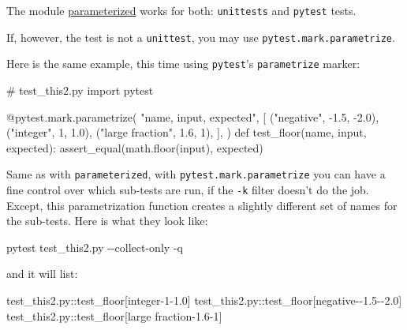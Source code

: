 \documentclass[
]{report}
\newenvironment{Shaded}{\begin{snugshade}}{\end{snugshade}}
\newcommand{\AttributeTok}[1]{\textcolor[rgb]{0.40,0.45,0.13}{#1}}
\newcommand{\BuiltInTok}[1]{\textcolor[rgb]{0.00,0.23,0.31}{#1}}
\newcommand{\CommentTok}[1]{\textcolor[rgb]{0.37,0.37,0.37}{#1}}
\newcommand{\DecValTok}[1]{\textcolor[rgb]{0.68,0.00,0.00}{#1}}
\newcommand{\ExtensionTok}[1]{\textcolor[rgb]{0.00,0.23,0.31}{#1}}
\newcommand{\FloatTok}[1]{\textcolor[rgb]{0.68,0.00,0.00}{#1}}
\newcommand{\ImportTok}[1]{\textcolor[rgb]{0.00,0.46,0.62}{#1}}
\newcommand{\KeywordTok}[1]{\textcolor[rgb]{0.00,0.23,0.31}{#1}}
\newcommand{\NormalTok}[1]{\textcolor[rgb]{0.00,0.23,0.31}{#1}}
\newcommand{\OperatorTok}[1]{\textcolor[rgb]{0.37,0.37,0.37}{#1}}
\newcommand{\StringTok}[1]{\textcolor[rgb]{0.13,0.47,0.30}{#1}}
\begin{document}
The module \href{https://pypi.org/project/parameterized/}{parameterized}
works for both: \texttt{unittests} and \texttt{pytest} tests.

If, however, the test is not a \texttt{unittest}, you may use
\texttt{pytest.mark.parametrize}.

Here is the same example, this time using \texttt{pytest}'s
\texttt{parametrize} marker:

\begin{Shaded}
\begin{Highlighting}[]
\CommentTok{\# test\_this2.py}
\ImportTok{import}\NormalTok{ pytest}


\AttributeTok{@pytest.mark.parametrize}\NormalTok{(}
    \StringTok{"name, input, expected"}\NormalTok{,}
\NormalTok{    [}
\NormalTok{        (}\StringTok{"negative"}\NormalTok{, }\OperatorTok{{-}}\FloatTok{1.5}\NormalTok{, }\OperatorTok{{-}}\FloatTok{2.0}\NormalTok{),}
\NormalTok{        (}\StringTok{"integer"}\NormalTok{, }\DecValTok{1}\NormalTok{, }\FloatTok{1.0}\NormalTok{),}
\NormalTok{        (}\StringTok{"large fraction"}\NormalTok{, }\FloatTok{1.6}\NormalTok{, }\DecValTok{1}\NormalTok{),}
\NormalTok{    ],}
\NormalTok{)}
\KeywordTok{def}\NormalTok{ test\_floor(name, }\BuiltInTok{input}\NormalTok{, expected):}
\NormalTok{    assert\_equal(math.floor(}\BuiltInTok{input}\NormalTok{), expected)}
\end{Highlighting}
\end{Shaded}

Same as with \texttt{parameterized}, with
\texttt{pytest.mark.parametrize} you can have a fine control over which
sub-tests are run, if the \texttt{-k} filter doesn't do the job. Except,
this parametrization function creates a slightly different set of names
for the sub-tests. Here is what they look like:

\begin{Shaded}
\begin{Highlighting}[]
\ExtensionTok{pytest}\NormalTok{ test\_this2.py }\AttributeTok{{-}{-}collect{-}only} \AttributeTok{{-}q}
\end{Highlighting}
\end{Shaded}

and it will list:

\begin{Shaded}
\begin{Highlighting}[]
\ExtensionTok{test\_this2.py::test\_floor[integer{-}1{-}1.0]}
\ExtensionTok{test\_this2.py::test\_floor[negative{-}{-}1.5{-}{-}2.0]}
\ExtensionTok{test\_this2.py::test\_floor[large}\NormalTok{ fraction{-}1.6{-}1]}
\end{Highlighting}
\end{Shaded}
\end{document}
